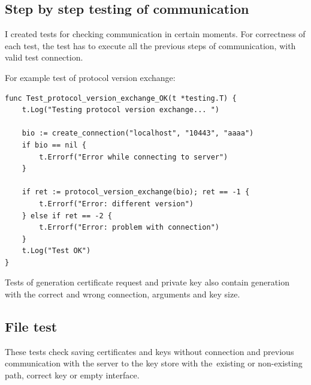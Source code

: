 \documentclass[
  12pt, 
  digital, %
  notable,   %
  nolof,     %
  nolot,     %
]{fithesis3}
\begin{document}
\subsection{Step by step testing of communication}

I created tests for checking communication in certain moments. For correctness of each test, the test has to execute all the previous steps of communication, with valid test connection.

For example test of protocol version exchange:
\begin{lstlisting}
func Test_protocol_version_exchange_OK(t *testing.T) {
	t.Log("Testing protocol version exchange... ")
		
	bio := create_connection("localhost", "10443", "aaaa")
	if bio == nil {
		t.Errorf("Error while connecting to server")
	}
	
	if ret := protocol_version_exchange(bio); ret == -1 {
		t.Errorf("Error: different version")
	} else if ret == -2 {
		t.Errorf("Error: problem with connection")
	} 
	t.Log("Test OK")
}
\end{lstlisting}

Tests of generation certificate request and private key also contain generation with the correct and wrong connection, arguments and key size.

\subsection{File test}
These tests check saving certificates and keys without connection and previous communication with 
the server to the key store with the~existing or non-existing path, correct key or empty 
interface. 

\end{document}
